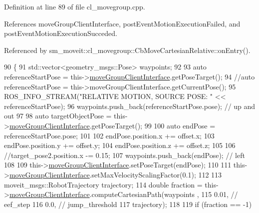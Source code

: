 Definition at line 89 of file cl\+\_\+movegroup.\+cpp.



References move\+Group\+Client\+Interface, post\+Event\+Motion\+Execution\+Failed, and post\+Event\+Motion\+Execution\+Succeded.



Referenced by sm\+\_\+moveit\+::cl\+\_\+movegroup\+::\+Cb\+Move\+Cartesian\+Relative\+::on\+Entry().


\begin{DoxyCode}
90 \{
91     std::vector<geometry\_msgs::Pose> waypoints;
92 
93     \textcolor{keyword}{auto} referenceStartPose = this->\hyperlink{classsm__moveit_1_1cl__movegroup_1_1ClMoveGroup_a23acf6883455566dbab30e4367c2144d}{moveGroupClientInterface}.getPoseTarget();
94     \textcolor{comment}{//auto referenceStartPose = this->moveGroupClientInterface.getCurrentPose();}
95     ROS\_INFO\_STREAM(\textcolor{stringliteral}{"RELATIVE MOTION, SOURCE POSE: "} << referenceStartPose);
96     waypoints.push\_back(referenceStartPose.pose); \textcolor{comment}{// up and out}
97 
98     \textcolor{keyword}{auto} targetObjectPose = this->\hyperlink{classsm__moveit_1_1cl__movegroup_1_1ClMoveGroup_a23acf6883455566dbab30e4367c2144d}{moveGroupClientInterface}.getPoseTarget();
99 
100     \textcolor{keyword}{auto} endPose = referenceStartPose.pose;
101 
102     endPose.position.x += offset.x;
103     endPose.position.y += offset.y;
104     endPose.position.z += offset.z;
105 
106     \textcolor{comment}{//target\_pose2.position.x -= 0.15;}
107     waypoints.push\_back(endPose); \textcolor{comment}{// left}
108 
109     this->\hyperlink{classsm__moveit_1_1cl__movegroup_1_1ClMoveGroup_a23acf6883455566dbab30e4367c2144d}{moveGroupClientInterface}.setPoseTarget(endPose);
110 
111     this->\hyperlink{classsm__moveit_1_1cl__movegroup_1_1ClMoveGroup_a23acf6883455566dbab30e4367c2144d}{moveGroupClientInterface}.setMaxVelocityScalingFactor(0.1);
112 
113     moveit\_msgs::RobotTrajectory trajectory;
114     \textcolor{keywordtype}{double} fraction = this->\hyperlink{classsm__moveit_1_1cl__movegroup_1_1ClMoveGroup_a23acf6883455566dbab30e4367c2144d}{moveGroupClientInterface}.computeCartesianPath(waypoints
      ,
115                                                                           0.01, \textcolor{comment}{// eef\_step}
116                                                                           0.0,  \textcolor{comment}{// jump\_threshold}
117                                                                           trajectory);
118 
119     \textcolor{keywordflow}{if} (fraction == -1)

\end{DoxyCode}
